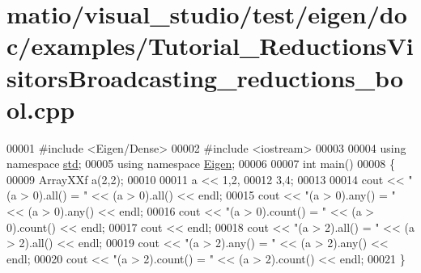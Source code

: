 \hypertarget{matio_2visual__studio_2test_2eigen_2doc_2examples_2_tutorial___reductions_visitors_broadcasting__reductions__bool_8cpp_source}{}\section{matio/visual\+\_\+studio/test/eigen/doc/examples/\+Tutorial\+\_\+\+Reductions\+Visitors\+Broadcasting\+\_\+reductions\+\_\+bool.cpp}
\label{matio_2visual__studio_2test_2eigen_2doc_2examples_2_tutorial___reductions_visitors_broadcasting__reductions__bool_8cpp_source}

\begin{DoxyCode}
00001 \textcolor{preprocessor}{#include <Eigen/Dense>}
00002 \textcolor{preprocessor}{#include <iostream>}
00003 
00004 \textcolor{keyword}{using namespace }\hyperlink{namespacestd}{std};
00005 \textcolor{keyword}{using namespace }\hyperlink{namespace_eigen}{Eigen};
00006 
00007 \textcolor{keywordtype}{int} main()
00008 \{
00009   ArrayXXf a(2,2);
00010   
00011   a << 1,2,
00012        3,4;
00013 
00014   cout << \textcolor{stringliteral}{"(a > 0).all()   = "} << (a > 0).all() << endl;
00015   cout << \textcolor{stringliteral}{"(a > 0).any()   = "} << (a > 0).any() << endl;
00016   cout << \textcolor{stringliteral}{"(a > 0).count() = "} << (a > 0).count() << endl;
00017   cout << endl;
00018   cout << \textcolor{stringliteral}{"(a > 2).all()   = "} << (a > 2).all() << endl;
00019   cout << \textcolor{stringliteral}{"(a > 2).any()   = "} << (a > 2).any() << endl;
00020   cout << \textcolor{stringliteral}{"(a > 2).count() = "} << (a > 2).count() << endl;
00021 \}
\end{DoxyCode}
